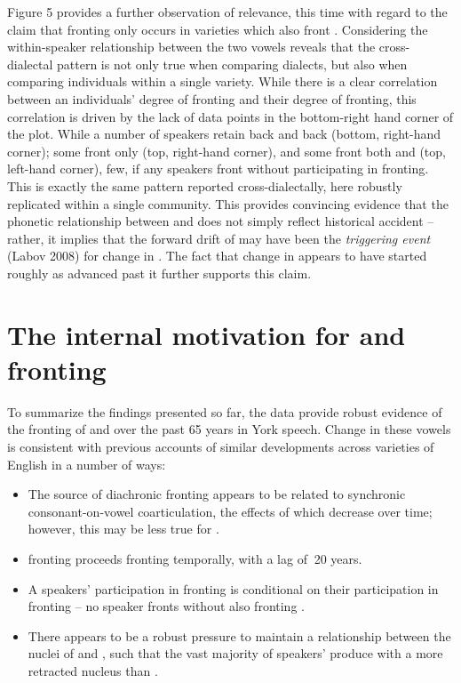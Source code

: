 \documentclass[12pt]{article}
\begin{document}
Figure 5 provides a further observation of relevance, this time with regard to the claim that  fronting only occurs in varieties which also front . Considering the within-speaker relationship between the two vowels reveals that the cross-dialectal pattern is not only true when comparing dialects, but also when comparing individuals within a single variety.  While there is a clear correlation between an individuals' degree of  fronting and their degree of  fronting, this correlation is driven by the lack of data points in the bottom-right hand corner of the plot. While a number of speakers retain back  and back  (bottom, right-hand corner); some front only  (top, right-hand corner), and some front both  and  (top, left-hand corner), few, if any speakers front  without participating in  fronting. This is exactly the same pattern reported cross-dialectally, here robustly replicated within a single community. This provides convincing evidence that the phonetic relationship between  and  does not simply reflect historical accident -- rather, it implies that the forward drift of  may have been the \textit{triggering event} (Labov 2008) for change in . The fact that change in  appears to have started roughly as  advanced past it further supports this claim.

\section{The internal motivation for  and  fronting}
To summarize the findings presented so far, the data provide robust evidence of the fronting of  and  over the past 65 years in York speech. Change in these vowels is consistent with previous accounts of similar developments across varieties of English in a number of ways:

\begin{itemize}
\item{The source of diachronic  fronting appears to be related to synchronic consonant-on-vowel coarticulation, the effects of which decrease over time; however, this may be less true for .}

\item{ fronting proceeds  fronting temporally, with a lag of $~$20 years.}

\item{A speakers' participation in  fronting is conditional on their participation in  fronting -- no speaker fronts  without also fronting .}

\item{There appears to be a robust pressure to maintain a relationship between the nuclei of  and , such that the vast majority of speakers' produce  with a more retracted nucleus than .}
\end{itemize}
\end{document}
